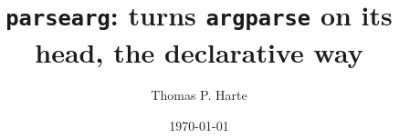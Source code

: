 \documentclass[10pt]{amsart}
\author{Thomas P. Harte}
\date{\today}
\title{\texttt{parsearg}: turns \texttt{argparse} on its head, the declarative way}
\numberwithin{equation}{section}
\begin{document}
\maketitle
\tableofcontents

\newcommand{\inv}[1]{{#1}^{-1}}

\newcommand{\envert}[1]{\left\lvert#1\right\rvert}
\let\abs=\envert

\newcommand{\enVert}[1]{\left\lVert#1\right\rVert}

\let\norm=\enVert

\newcommand{\PE}{\mbox{PE}}             %

\newcommand{\EVA}{\mbox{EVA}}             %
\newcommand{\CTE}{\mbox{CTE}}             %
\newcommand{\VaR}{\mbox{VaR}}             %
\newcommand{\PAR}{\mbox{PAR}}             %
\newcommand{\TR}{\mbox{TR}}             %

\newcommand{\Primafacie}{\emph{Prima facie\/}}
\newcommand{\primafacie}{\emph{prima facie\/}}
\newcommand{\Mutatis}{\emph{Mutatis mutandis\/}}
\newcommand{\mutatis}{\emph{mutatis mutandis\/}}
\newcommand{\Apriori}{\emph{A~priori\/}}
\newcommand{\apriori}{\emph{a~priori\/}}
\newcommand{\Adhoc}{\emph{Ad~hoc\/}}
\newcommand{\adhoc}{\emph{ad~hoc\/}}
\newcommand{\qua}{\emph{qua\/}}
\newcommand{\etc}{\emph{etc.\/}}
\newcommand{\ie}{\emph{i.e.\/}}
\newcommand{\eg}{\emph{e.g.\/}}
\newcommand{\viz}{\emph{viz.\/}}
\newcommand{\perse}{\emph{per~se\/}}
\newcommand{\intoto}{\emph{in~toto\/}}
\newcommand{\interalia}{\emph{inter~alia\/}}
\newcommand{\notabene}{\emph{nota~bene\/}}
\newcommand{\Notabene}{\emph{Nota~bene\/}}
\newcommand{\etal}{\emph{et~al.,\/}}
\newcommand{\cf}{cf.\/}                %
\newcommand{\sic}{[\emph{sic}]}
\newcommand{\etseq}{\emph{et~seq.\/}}        %
\newcommand{\etsqq}{\emph{et~sqq.\/}}        %
\newcommand{\Page}{\emph{p.\/}}            %
\newcommand{\pp}{\emph{pp.\/}}            %
\newcommand{\visavis}{\emph{vis~\`a~vis\/}}    %

\newcommand{\field}[1]{\mathbb{#1}}
\newcommand{\BB}{\field{B}}
\newcommand{\CC}{\field{C}}
\newcommand{\EE}{\field{E}}
\newcommand{\FF}{\field{F}}
\newcommand{\MM}{\field{N}}
\newcommand{\NN}{\field{N}}
\newcommand{\PP}{\field{P}}
\newcommand{\QQ}{\field{Q}}
\newcommand{\RR}{\field{R}}
\newcommand{\VV}{\field{V}}
\newcommand{\WW}{\field{W}}
\newcommand{\XX}{\field{X}}
\newcommand{\ZZ}{\field{Z}}
\end{document}
